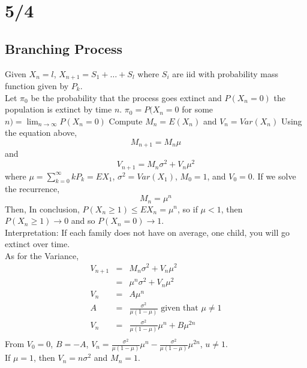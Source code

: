 \section*{5/4}
  \subsection*{Branching Process}
    Given $X_n = l$, $X_{n+1} = S_1 + \ldots + S_l$ where $S_i$ are
    iid with probability mass function given by $P_k$.\\
    Let $\pi_0$ be the probability that the process goes extinct and
    $P(X_n = 0)$ the population is extinct by time $n$.
    $\pi_0 = P(X_n = 0$ for some $n) = \lim_{n \to \infty} P(X_n = 0)$
    Compute $M_n = E(X_n)$ and $V_n = Var(X_n)$
    Using the equation above, 
    $$
      M_{n+1} = M_n\mu
    $$ and 
    $$
      V_{n+1} = M_n \sigma^2 + V_n\mu^2
    $$
    where $\mu = \sum_{k = 0}^{\infty} kP_k = EX_1$, $\sigma^2 =
    Var(X_1)$, $M_0 = 1$, and $V_0 = 0$. If we solve the recurrence,
    $$
      M_n = \mu^n
    $$
    Then,
    In conclusion, $P(X_n \ge 1) \le EX_n = \mu^n$, so if
    $\mu < 1$, then $P(X_n \ge 1) \to 0$ and so $P(X_n = 0) \to 1$.\\
    Interpretation: If each family does not have on average, one 
    child, you will go extinct over time.\\
    As for the Variance,
    \begin{eqnarray*}
      V_{n + 1} & = & M_n \sigma^2 + V_n \mu^2\\
        & = & \mu^n\sigma^2 + V_n \mu^2\\
      V_n & = & A\mu^n\\
      A & = & \frac{\sigma^2}{\mu(1 - \mu)} \text{ given that } \mu 
        \not= 1\\
      V_n & = & \frac{\sigma^2}{\mu(1-\mu)} \mu^n + B\mu^{2n}\\
    \end{eqnarray*}
    From $V_0 = 0$, $B = -A$, $V_n = \frac{\sigma^2}{\mu(1 - \mu)}
      \mu^n - \frac{\sigma^2}{\mu(1 - \mu)}\mu^{2n}$, $u \not= 1$.\\
    If $\mu = 1$, then $V_n = n\sigma^2$ and $M_n = 1$.\\\\

